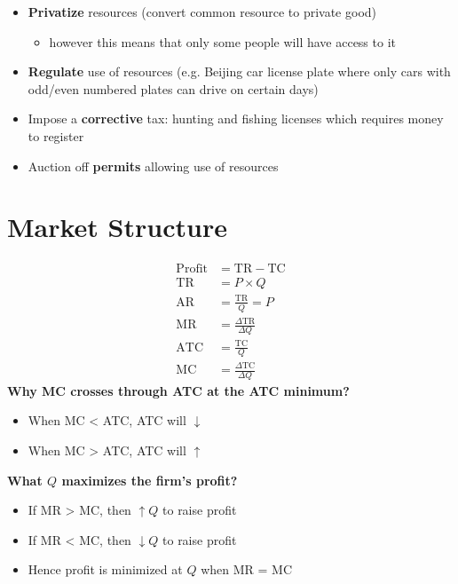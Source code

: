 \documentclass{article}
\begin{document}
\begin{multicols}{2}
\begin{itemize}
\begin{itemize}
    	\item \textbf{Privatize} resources (convert common resource to private good)
    	\begin{itemize}
    		\item however this means that only some people will have access to it
    	\end{itemize}
        \item \textbf{Regulate} use of resources (e.g. Beijing car license plate where only cars with odd/even numbered plates can drive on certain days)
        \item Impose a \textbf{corrective} tax: hunting and fishing licenses which requires money to register
        \item Auction off \textbf{permits} allowing use of resources
    \end{itemize}
\end{itemize}
\section{Market Structure}
\begin{equation*}
	\begin{aligned}
		\text{Profit} &= \text{TR} - \text{TC}\\
		\text{TR} &= P \times Q \\
		\text{AR} &= \frac{\text{TR}}{Q} = P\\
		\text{MR} &= \frac{\Delta \text{TR}}{\Delta Q}\\
		\text{ATC} &= \frac{\text{TC}}{Q}\\
		\text{MC} &= \frac{\Delta \text{TC}}{\Delta Q}
	\end{aligned}
\end{equation*}
\textbf{Why MC crosses through ATC at the ATC minimum?}
\begin{itemize}
	\item When MC < ATC, ATC will $\downarrow$
	\item When MC > ATC, ATC will $\uparrow$
\end{itemize}
\textbf{What $Q$ maximizes the firm's profit?}
\begin{itemize}
	\item If MR > MC, then $\uparrow Q$ to raise profit
	\item If MR < MC, then $\downarrow Q$ to raise profit
	\item Hence profit is minimized at $Q$ when MR = MC
\end{itemize}


\end{multicols}
\end{document}
